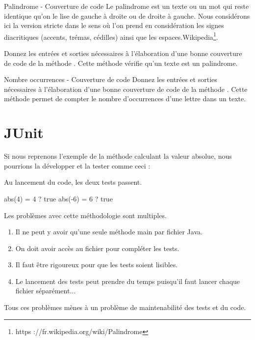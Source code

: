 \documentclass[a4paper,11pt]{article}
\begin{document}
	\begin{Exercice}{Palindrome - Couverture de code}
		\og Le palindrome est un texte ou un mot qui reste identique qu’on le lise de gauche à droite ou de droite à gauche. Nous considérons ici la version stricte dans le sens où l’on prend en considération les signes diacritiques (accents, trémas, cédilles) ainsi que les espaces.\fg Wikipedia\footnote{https ://fr.wikipedia.org/wiki/Palindrome}.

		Donnez les entrées et sorties nécessaires à l’élaboration d’une bonne couverture de code de la méthode . Cette méthode vérifie qu'un texte est un palindrome.
	\end{Exercice}

	\begin{Exercice}{Nombre occurrences - Couverture de code}
		Donnez les entrées et sorties nécessaires à l’élaboration d’une bonne couverture de code de la méthode . Cette méthode permet de compter le nombre d'occurrences d’une lettre dans un texte.
	\end{Exercice}

\section{JUnit}

	Si nous reprenons l’exemple de la méthode calculant la valeur absolue, nous pourrions la développer et la tester comme ceci :

	Au lancement du code, les deux tests passent.
	\begin{Console}
		abs(4) = 4 ? true
		abs(-6) = 6 ? true
	\end{Console}

	Les problèmes avec cette méthodologie sont multiples.
	\begin{enumerate}
		\item Il ne peut y avoir qu’une seule méthode main par fichier Java.
 		\item On doit avoir accès au fichier pour compléter les tests.
 		\item Il faut être rigoureux pour que les tests soient lisibles.
 		\item Le lancement des tests peut prendre du temps puisqu'il faut lancer chaque fichier séparément...
	\end{enumerate}
	Tous ces problèmes mènes à un problème de maintenabilité des tests et du code.
\end{document}
